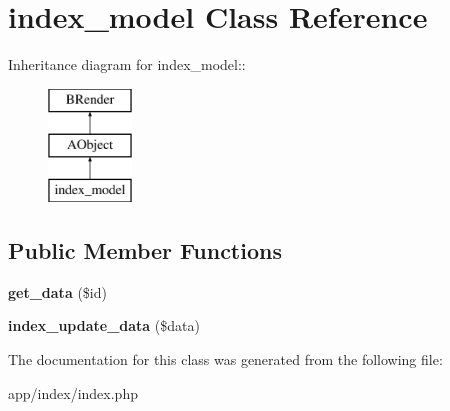 \section{index\_\-model Class Reference}
\label{classindex__model}
Inheritance diagram for index\_\-model::\begin{figure}[H]
\begin{center}
\leavevmode
\includegraphics[height=3cm]{classindex__model}
\end{center}
\end{figure}
\subsection*{Public Member Functions}
\begin{DoxyCompactItemize}
\item 
{\bfseries get\_\-data} (\$id)\label{classindex__model_a9f5185461d461fcf8a41d47961e162ed}

\item 
{\bfseries index\_\-update\_\-data} (\$data)\label{classindex__model_a0de434198bdd95065d2c9043cd5fbb1d}

\end{DoxyCompactItemize}


The documentation for this class was generated from the following file:\begin{DoxyCompactItemize}
\item 
app/index/index.php\end{DoxyCompactItemize}
